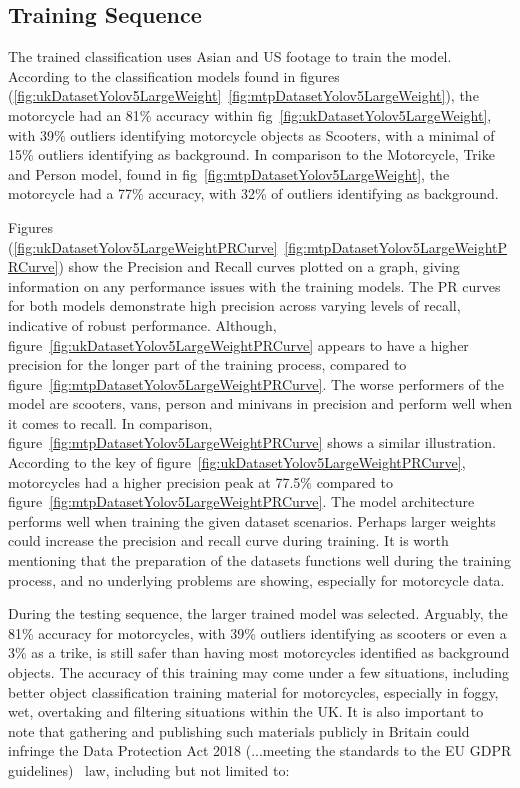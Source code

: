 \documentclass[conference]{IEEEtran}
\begin{document}
	\subsection{Training Sequence}
	The trained classification uses Asian and US footage to train the model. According to the classification models found in figures (\ref{fig:ukDatasetYolov5LargeWeight}~\ref{fig:mtpDatasetYolov5LargeWeight}), the motorcycle had an 81\% accuracy within fig~\ref{fig:ukDatasetYolov5LargeWeight}, with 39\% outliers identifying motorcycle objects as Scooters, with a minimal of 15\% outliers identifying as background. In comparison to the Motorcycle, Trike and Person model, found in fig~\ref{fig:mtpDatasetYolov5LargeWeight}, the motorcycle had a 77\% accuracy, with 32\% of outliers identifying as background.

    Figures (\ref{fig:ukDatasetYolov5LargeWeightPRCurve}~\ref{fig:mtpDatasetYolov5LargeWeightPRCurve}) show the Precision and Recall curves plotted on a graph, giving information on any performance issues with the training models. The PR curves for both models demonstrate high precision across varying levels of recall, indicative of robust performance. Although, figure~\ref{fig:ukDatasetYolov5LargeWeightPRCurve} appears to have a higher precision for the longer part of the training process, compared to figure~\ref{fig:mtpDatasetYolov5LargeWeightPRCurve}. The worse performers of the model are scooters, vans, person and minivans in precision and perform well when it comes to recall. In comparison, figure~\ref{fig:mtpDatasetYolov5LargeWeightPRCurve} shows a similar illustration. According to the key of figure~\ref{fig:ukDatasetYolov5LargeWeightPRCurve}, motorcycles had a higher precision peak at 77.5\% compared to figure~\ref{fig:mtpDatasetYolov5LargeWeightPRCurve}. The model architecture performs well when training the given dataset scenarios. Perhaps larger weights could increase the precision and recall curve during training. It is worth mentioning that the preparation of the datasets functions well during the training process, and no underlying problems are showing, especially for motorcycle data.

	During the testing sequence, the larger trained model was selected. Arguably, the 81\% accuracy for motorcycles, with 39\% outliers identifying as scooters or even a 3\% as a trike, is still safer than having most motorcycles identified as background objects. The accuracy of this training may come under a few situations, including better object classification training material for motorcycles, especially in foggy, wet, overtaking and filtering situations within the UK. It is also important to note that gathering and publishing such materials publicly in Britain could infringe the Data Protection Act 2018 (...meeting the standards to the EU GDPR guidelines)~\cite{govuk_data_2018} law, including but not limited to:
\end{document}
